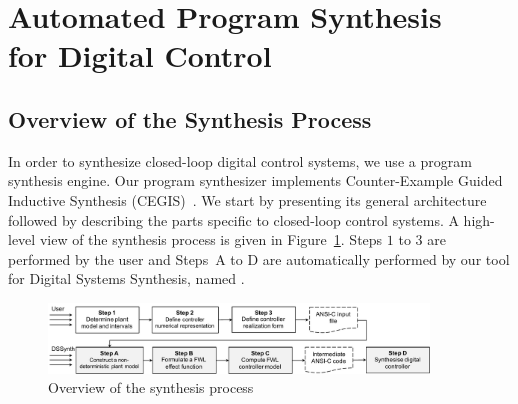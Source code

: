 \documentclass[final]{sig-alternate-05-2015}
\begin{document}
\section{Automated Program Synthesis \\ for Digital
Control}\label{sec:synthesis}

\subsection{Overview of the Synthesis Process}
\label{verification-flow}

In order to synthesize closed-loop digital control systems, we use a program
synthesis engine.  Our program synthesizer implements Counter-Example Guided
Inductive Synthesis (CEGIS)~\cite{sketch}.  We start by presenting its
general architecture followed by describing the parts specific to
closed-loop control systems.  A high-level view of the synthesis process is
given in Figure~\ref{DSSynth_process}.  Steps $1$ to $3$ are performed by
the user and Steps~A to D are automatically performed by our tool for
Digital Systems Synthesis, named \tool.
%

\begin{figure}[t]
\centering
\includegraphics[width=0.9\textwidth]{figures/synthesis-flow.pdf}
\vspace{0.1cm}
\caption{Overview of the synthesis process\label{DSSynth_process}}
\end{figure}

\end{document}
